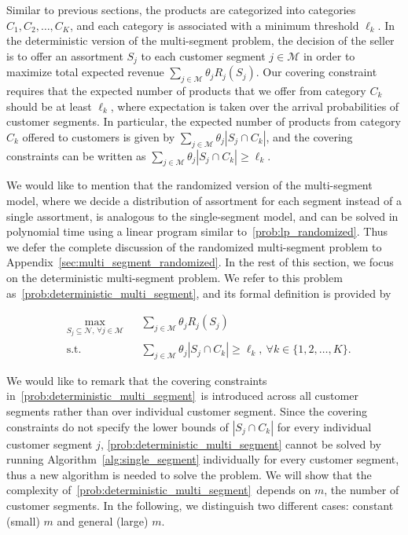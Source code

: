 \documentclass[msom,non-blindrev]{informs3} %
\theoremstyle{definition}
\begin{document}
Similar to previous sections, the products are categorized into categories $C_1,C_2,\dots,C_K$, and each category is associated with a minimum threshold $\ell_k$. 
In the deterministic version of the multi-segment problem, the decision of the seller is to offer an assortment $S_j$  to each customer segment $j\in\mathcal{M}$ in order to maximize total expected revenue $\sum_{j\in\mathcal{M}}\theta_jR_j(S_j)$.
Our covering constraint requires that the expected number of products that we offer from category $C_k$  should be at least $\ell_k$, where expectation is taken over  the arrival probabilities of customer segments. In particular, the expected number of products from category $C_k$ {  offered} to customers is given by $\sum_{j\in\mathcal{M}}\theta_j|S_j\cap C_k|$, and the covering constraints can be written as $\sum_{j\in\mathcal{M}}\theta_j|S_j\cap C_k|\geq \ell_k$.



We would like to mention that the randomized version of the multi-segment model, where we decide a distribution of assortment for each segment instead of a single assortment, is analogous to the single-segment model, and can be solved in polynomial time using a linear program similar to~\eqref{prob:lp_randomized}. Thus we defer the complete discussion of the randomized multi-segment problem to Appendix~\ref{sec:multi_segment_randomized}. In the rest of this section, we focus on the deterministic multi-segment problem. We refer to this problem as~\eqref{prob:deterministic_multi_segment}, and its formal definition is provided by



\begin{equation}\label{prob:deterministic_multi_segment}\tag{m-DAOC}
\begin{aligned}
&\max_{S_j\subseteq\mathcal{N},\,\forall j\in\mathcal{M}}&&{\sum_{j\in\mathcal{M}}\theta_jR_j(S_j)}\\
&\text{s.t.}&&{\sum_{j\in\mathcal{M}}\theta_j|S_j\cap C_k|\geq \ell_k,\ \forall k\in\{1,2,\dots,K\}.}
\end{aligned}
\end{equation}

{  We would like to remark that the covering constraints in~\eqref{prob:deterministic_multi_segment}~is introduced across all customer segments rather than over individual customer segment. Since the covering constraints do not specify the lower bounds of $|S_j\cap C_k|$ for every individual customer segment $j$, \eqref{prob:deterministic_multi_segment} cannot be solved by running Algorithm~\ref{alg:single_segment} individually for every customer segment, thus a new algorithm is needed to solve the problem.} We will show that the complexity of~\eqref{prob:deterministic_multi_segment}~depends on $m$, the number of customer segments. In the following, we distinguish two different cases: constant (small) $m$ and general (large) $m$.
\end{document}
